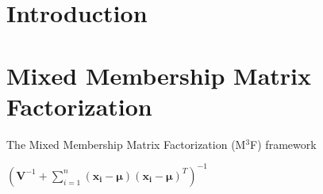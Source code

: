 \documentclass{article}
\author{John Min}
\begin{document}
\section{Introduction}


\section{Mixed Membership Matrix Factorization}
The Mixed Membership Matrix Factorization (M$^3$F) framework


$\left(\mathbf{V}^{-1} + \sum_{i=1}^n (\mathbf{x_i} - \boldsymbol\mu) (\mathbf{x_i} - \boldsymbol\mu)^T\right)^{-1}$
\end{document}
